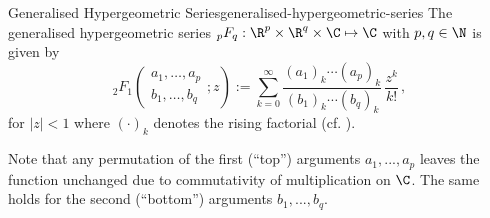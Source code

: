 \begin{definition}{Generalised Hypergeometric Series}{generalised-hypergeometric-series}
  The generalised hypergeometric series ${}_pF_q: \R^p \times \R^q \times \C \mapsto \C$ with $p, q \in \N$ is given by
  $${}_2F_1\left(\begin{matrix}a_{1}, \ldots, a_{p} \\b_{1}, \ldots, b_{q}\end{matrix}; z\right) := \sum _{k=0}^{\infty }{\frac {(a_{1})_{k}\cdots (a_{p})_{k}}{(b_{1})_{k}\cdots (b_{q})_{k}}}\,{\frac {z^{k}}{k!}}\,,$$
  for $|z| < 1$ where $(\cdot)_k$ denotes the rising factorial (cf. ).
\end{definition}

Note that any permutation of the first (``top'') arguments $a_1, ..., a_p$ leaves the function unchanged due to commutativity of multiplication on $\C$. The same holds for the second (``bottom'') arguments $b_1, ..., b_q$.

